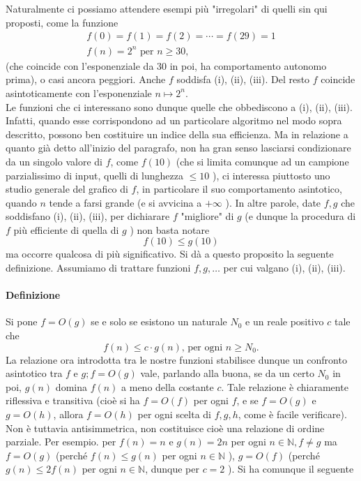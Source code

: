 Naturalmente ci possiamo attendere esempi più "irregolari" di quelli sin qui
proposti, come la funzione
$$
    \begin{gathered}
        f(0)=f(1)=f(2)=\cdots=f(29)=1 \\
        f(n)=2^n \text { per } n \geq 30,
    \end{gathered}
$$
(che coincide con l'esponenziale da 30 in poi, ha comportamento autonomo prima),
o casi ancora peggiori. Anche $f$ soddisfa (i), (ii), (iii). Del resto $f$
coincide asintoticamente con l'esponenziale $n \mapsto 2^n$.\\
Le funzioni che ci
interessano sono dunque quelle che obbediscono a (i), (ii), (iii). Infatti,
quando esse corrispondono ad un particolare algoritmo nel modo sopra descritto,
possono ben costituire un indice della sua efficienza. Ma in relazione a quanto
già detto all'inizio del paragrafo, non ha gran senso lasciarsi condizionare da
un singolo valore di $f$, come $f(10)$ (che si limita comunque ad un campione
parzialissimo di input, quelli di lunghezza $\leq 10$ ), ci interessa piuttosto
uno studio generale del grafico di $f$, in particolare il suo comportamento
asintotico, quando $n$ tende a farsi grande (e si avvicina a $+\infty$
). In altre parole, date $f, g$ che soddisfano (i), (ii), (iii), per dichiarare
$f$ "migliore" di $g$ (e dunque la procedura di $f$ più efficiente di quella di
$g$ ) non basta notare
$$
    f(10) \leq g(10)
$$
ma occorre qualcosa di più significativo. Si dà a questo proposito la seguente
definizione. Assumiamo di trattare funzioni $f, g, \ldots$ per cui valgano (i),
(ii), (iii).

\paragraph{Definizione} Si pone $f=O(g)$ se e solo se esistono un naturale
$N_0$ e un reale positivo $c$ tale che
$$
    f(n) \leq c \cdot g(n) \text {, per ogni } n \geq N_0 .
$$
La relazione ora introdotta tra le nostre funzioni stabilisce dunque un
confronto asintotico tra $f$ e $g ; f=O(g)$ vale, parlando alla buona, se da un
certo $N_0$ in poi, $g(n)$ domina $f(n)$ a meno della costante $c$. Tale
relazione è chiaramente riflessiva e transitiva (cioè si ha $f=O(f)$ per ogni
$f$, e se $f=O(g)$ e $g=O(h)$, allora $f=O(h)$ per ogni scelta di $f, g, h$,
come è facile verificare). Non è tuttavia antisimmetrica, non costituisce cioè
una relazione di ordine parziale. Per esempio. per $f(n)=n$ e $g(n)=2 n$ per
ogni $n \in \mathbb{N}, f \neq g$ ma $f=O(g)$ (perché $f(n) \leq g(n)$ per ogni
$n \in \mathbb{N}$ ), $g=O(f)$ (perché $g(n) \leq 2 f(n)$ per ogni $n \in
    \mathbb{N}$, dunque per $c=2$ ). Si ha comunque il seguente

